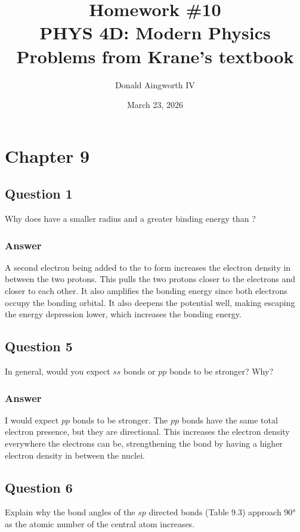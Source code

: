 \documentclass[12pt]{article}
\title{
    Homework \#10
    \\  \small
    PHYS 4D: Modern Physics
    \\
    Problems from Krane's textbook
    }
\author{Donald Aingworth IV}
\date{March 23, 2026}
\begin{document}
\maketitle
{}

\section{Chapter 9}
    \subsection{Question 1}
        Why does  have a smaller radius and a greater binding energy than ?

        \subsubsection{Answer}
            A second electron being added to the  to form  increases the electron density in between the two protons. 
            This pulls the two protons closer to the electrons and closer to each other. 
            It also amplifies the bonding energy since both electrons occupy the bonding orbital. 
            It also deepens the potential well, making escaping the energy depression lower, which increases the bonding energy.

    \subsection{Question 5}
        In general, would you expect $ss$ bonds or $pp$ bonds to be stronger? 
        Why?

        \subsubsection{Answer}
            I would expect $pp$ bonds to be stronger.
            The $pp$ bonds have the same total electron presence, but they are directional. 
            This increases the electron density everywhere the electrons can be, strengthening the bond by having a higher electron density in between the nuclei.
        
    \subsection{Question 6}
        Explain why the bond angles of the $sp$ directed bonds (Table 9.3) approach 90\unit{\degree} as the atomic number of the central atom increases.
\end{document}
